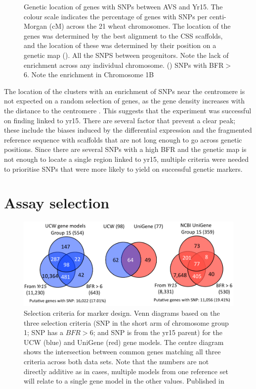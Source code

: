 \begin{figure}
\begin{subfigure}{0.45\textwidth}
	\end{subfigure}
	\caption[Genetic location of genes with SNPs between AVS and Yr15.]{Genetic location of genes with SNPs between AVS and Yr15. The colour scale indicates the percentage of genes with SNPs per centi-Morgan (cM) across the 21 wheat chromosomes. The location of the genes was determined by the best alignment to the CSS scaffolds, and the location of these was determined by their position on a genetic map \citep{Wang2014} (). All the SNPS between progenitors. Note the lack of enrichment across any individual chromosome. () SNPs with BFR$>$6. Note the enrichment in Chromosome 1B }
	\label{fig:yr15:bfrs:0-6}
\end{figure}

The location of the clusters with an enrichment of SNPs near the centromere is not expected on a random selection of genes, as the gene density increases with the distance to the centromere \citep{Akhunov2003}. 
This suggests that the experiment was successful on finding  linked to \acrshort{yr15}. 
There are several factor that prevent a clear peak; these include the biases induced by the differential expression and the fragmented reference sequence with scaffolds that are not long enough to go across genetic positions. 
Since there are several SNPs with a high BFR and the genetic map is not enough to locate a single region linked to \acrshort{yr15},  multiple criteria were needed to prioritise SNPs that were more likely to yield on successful genetic markers.

\section{Assay selection} 
\label{yr15:assaySelection}
\begin{figure}
\centering
\includegraphics[width=1\textwidth]{Yr15/Figures/selection/snpSets.pdf}
\caption[Selection criteria for marker design]{Selection criteria for marker design. Venn diagrams based on the three selection criteria (SNP in the short arm of chromosome group 1; SNP has a $BFR>6$; and SNP is from the \acrshort{yr15} parent) for the UCW (blue) and UniGene (red) gene models. The centre diagram shows the intersection between common genes matching all three criteria across both data sets. Note that the numbers are not directly additive as in cases, multiple models from one reference set will relate to a single gene model in the other values. Published in \citep{Ramirez-Gonzalez2015b} }
\label{fig:yr15:snpset}
\end{figure}

